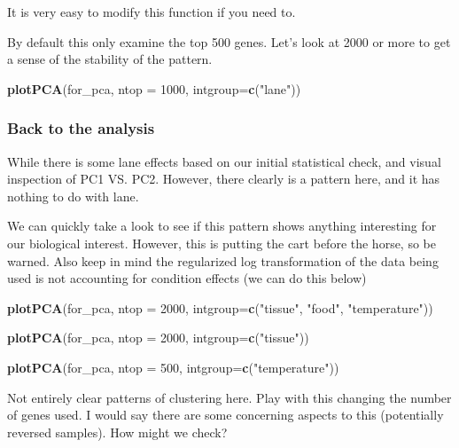 \documentclass[
]{article}
\newenvironment{Shaded}{\begin{snugshade}}{\end{snugshade}}
\newcommand{\DataTypeTok}[1]{\textcolor[rgb]{0.13,0.29,0.53}{#1}}
\newcommand{\DecValTok}[1]{\textcolor[rgb]{0.00,0.00,0.81}{#1}}
\newcommand{\KeywordTok}[1]{\textcolor[rgb]{0.13,0.29,0.53}{\textbf{#1}}}
\newcommand{\NormalTok}[1]{#1}
\newcommand{\StringTok}[1]{\textcolor[rgb]{0.31,0.60,0.02}{#1}}
\begin{document}
It is very easy to modify this function if you need to.

By default this only examine the top 500 genes. Let's look at 2000 or
more to get a sense of the stability of the pattern.

\begin{Shaded}
\begin{Highlighting}[]
\KeywordTok{plotPCA}\NormalTok{(for_pca, }
        \DataTypeTok{ntop =} \DecValTok{1000}\NormalTok{, }
        \DataTypeTok{intgroup=}\KeywordTok{c}\NormalTok{(}\StringTok{"lane"}\NormalTok{)) }
\end{Highlighting}
\end{Shaded}

\hypertarget{back-to-the-analysis}{%
\subsubsection{Back to the analysis}\label{back-to-the-analysis}}

While there is some lane effects based on our initial statistical check,
and visual inspection of PC1 VS. PC2. However, there clearly is a
pattern here, and it has nothing to do with lane.

We can quickly take a look to see if this pattern shows anything
interesting for our biological interest. However, this is putting the
cart before the horse, so be warned. Also keep in mind the regularized
log transformation of the data being used is not accounting for
condition effects (we can do this below)

\begin{Shaded}
\begin{Highlighting}[]
\KeywordTok{plotPCA}\NormalTok{(for_pca, }\DataTypeTok{ntop =} \DecValTok{2000}\NormalTok{,}
        \DataTypeTok{intgroup=}\KeywordTok{c}\NormalTok{(}\StringTok{"tissue"}\NormalTok{, }\StringTok{"food"}\NormalTok{, }\StringTok{"temperature"}\NormalTok{))}

\KeywordTok{plotPCA}\NormalTok{(for_pca, }\DataTypeTok{ntop =} \DecValTok{2000}\NormalTok{,}
        \DataTypeTok{intgroup=}\KeywordTok{c}\NormalTok{(}\StringTok{"tissue"}\NormalTok{))}

\KeywordTok{plotPCA}\NormalTok{(for_pca, }\DataTypeTok{ntop =} \DecValTok{500}\NormalTok{,}
        \DataTypeTok{intgroup=}\KeywordTok{c}\NormalTok{(}\StringTok{"temperature"}\NormalTok{))}
\end{Highlighting}
\end{Shaded}

Not entirely clear patterns of clustering here. Play with this changing
the number of genes used. I would say there are some concerning aspects
to this (potentially reversed samples). How might we check?
\end{document}
